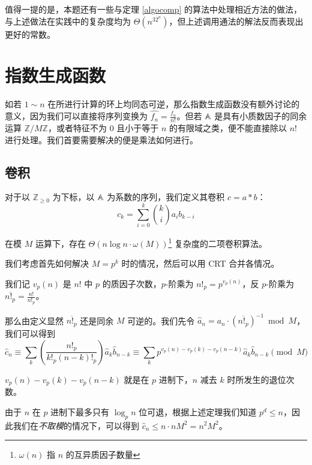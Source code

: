 值得一提的是，本题还有一些与定理 \ref{algocomp} 的算法中处理相近方法的做法，与上述做法在实践中的复杂度均为 $\Theta(n^32^n)$，但上述调用通法的解法反而表现出更好的常数。

\section{指数生成函数}

如若 $1\sim n$ 在所进行计算的环上均同态可逆，那么指数生成函数没有额外讨论的意义，因为我们可以直接将序列变换为 $\widehat {f_n} = \frac {f_n}{n!}$。但若 $\mathbb A$ 是具有小质数因子的同余运算 $\mathbb Z/M\mathbb Z$，或者特征不为 $0$ 且小于等于 $n$ 的有限域之类，便不能直接除以 $n!$ 进行处理。我们首要需要解决的便是乘法如何进行。

\subsection{卷积}

\begin{definition}[二项卷积]
对于以 $\mathbb Z_{\ge 0}$ 为下标，以 $\mathbb A$ 为系数的序列，我们定义其卷积 $c = a * b$：
$$
c_k = \sum_{i = 0}^k \binom k i a_i b_{k-i}
$$
\end{definition}

\begin{theorem}
在模 $M$ 运算下，存在 $\Theta(n\log n \cdot \omega(M))$\footnote{$\omega(n)$ 指 $n$ 的互异质因子数量} 复杂度的二项卷积算法。
\end{theorem}

我们考虑首先如何解决 $M = p^k$ 时的情况，然后可以用 CRT 合并各情况。

我们记 $v_p(n)$ 是 $n!$ 中 $p$ 的质因子次数，$p$-阶乘为 $n!_p = p^{v_p(n)}$，反 $p$-阶乘为 $\overline{n!_p} = \frac{n!}{n!_p}$。

那么由定义显然 $\overline{n!_p}$ 还是同余 $M$ 可逆的。我们先令 $\widehat a_n = a_n \cdot \left( \overline{n!_p} \right)^{-1} \bmod M$，我们可以得到
$$
\widehat c_n \equiv \sum_k \left(\frac{n!_p}{k!_p (n-k)!_p}\right) \widehat a_k \widehat b_{n-k} \equiv \sum_k p^{v_p(n)-v_p(k)-v_p(n-k)} \widehat a_k \widehat b_{n-k} \pmod M
$$

\begin{theorem}[Kummer]

$v_p(n)-v_p(k)-v_p(n-k)$ 就是在 $p$ 进制下，$n$ 减去 $k$ 时所发生的退位次数。

\end{theorem}

由于 $n$ 在 $p$ 进制下最多只有 $\log_p n$ 位可退，根据上述定理我们知道 $p^d \le n$，因此我们在\emph{不取模}的情况下，可以得到 $\widehat c_n \le n \cdot nM^2 = n^2M^2$。

